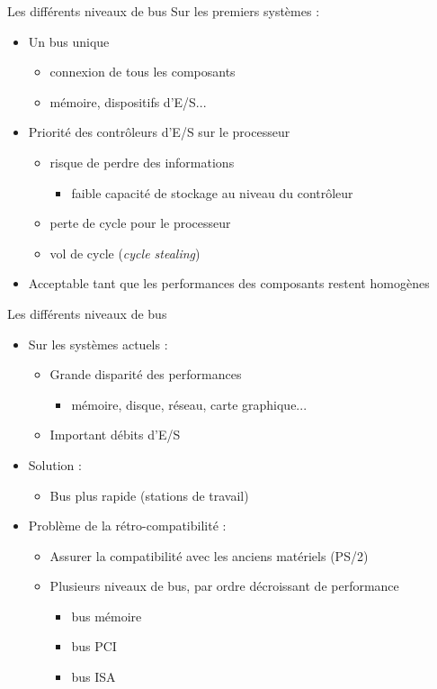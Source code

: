 \begin{frame}{Les différents niveaux de bus}
Sur les premiers systèmes :
\begin{itemize}
\item Un bus unique
\begin{itemize}
\item connexion de tous les composants
\item mémoire, dispositifs d'E/S...
\end{itemize}
\item Priorité des contrôleurs d'E/S sur le processeur
\begin{itemize}
\item risque de perdre des informations
\begin{itemize}
\item faible capacité de stockage au niveau du contrôleur
\end{itemize}

\item perte de cycle pour le processeur
\item vol de cycle (\textit{cycle stealing})
\end{itemize}
\item Acceptable tant que les performances des composants restent homogènes
\end{itemize}
\end{frame}


\begin{frame}{Les différents niveaux de bus}
\begin{itemize}
\item Sur les systèmes actuels :
  \begin{itemize}
    \item Grande disparité des performances
      \begin{itemize}
        \item mémoire, disque, réseau, carte graphique...
      \end{itemize}
    \item Important débits d'E/S
  \end{itemize}
    \item Solution :
    \begin{itemize}
	\item Bus plus rapide (stations de travail)
    \end{itemize}


  \item Problème de la rétro-compatibilité :
  \begin{itemize}
    \item Assurer la compatibilité avec les anciens matériels (PS/2)
    \item Plusieurs niveaux de bus, par ordre décroissant de performance
    \begin{itemize}
      \item bus mémoire
      \item bus PCI
      \item bus ISA
    \end{itemize}
  \end{itemize}
\end{itemize}
\end{frame}


